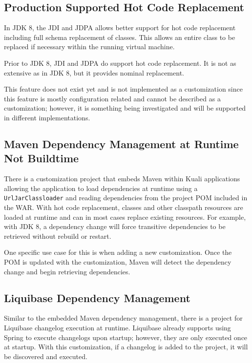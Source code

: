 \documentclass[12pt]{report}
\begin{document}
\subsection{Production Supported Hot Code Replacement}

In JDK 8, the JDI and JDPA allows better support for hot code replacement including full schema replacement of classes. This allows an 
entire class to be replaced if necessary within the running virtual machine. 

Prior to JDK 8, JDI and JDPA do support hot code replacement. It is not as extensive as in JDK 8, but it provides nominal replacement.

This feature does not exist yet and is not implemented as a customization since this feature is mostly configuration related and cannot
be described as a customization; however, it is something being investigated and will be supported in different implementations.

\subsection{Maven Dependency Management at Runtime Not Buildtime}

There is a customization project that embeds Maven within Kuali applications allowing the application to load dependencies at runtime
using a \verb|UrlJarClassloader| and reading dependencies from the project POM included in the WAR. With hot code replacement, classes and other 
classpath resources are loaded at runtime and can in most cases replace existing resources. For example, with JDK 8, a dependency
change will force transitive dependencies to be retrieved without rebuild or restart. 

One specific use case for this is when adding a new customization. Once the POM is updated with the customization, Maven will detect
the dependency change and begin retrieving dependencies.

\subsection{Liquibase Dependency Management}

Similar to the embedded Maven dependency management, there is a project for Liquibase changelog execution at runtime. Liquibase already
supports using Spring to execute changelogs upon startup; however, they are only executed once at startup. With this customization,
if a changelog is added to the project, it will be discovered and executed. 
\end{document}
